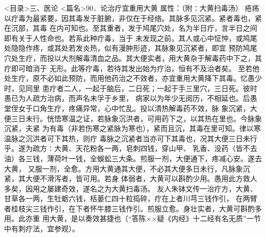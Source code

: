 \documentclass[a4paper,12pt,UTF8,twoside]{ctexbook}
\begin{document}
<目录>三、医论
<篇名>90．论治疔宜重用大黄
属性：（附∶大黄扫毒汤） 
疮疡以疔毒为最紧要，因其毒发于脏腑，非仅在于经络。其脉多见沉紧。紧者毒也，紧在沉部，其毒 
在内可知也。至其重者，发于鸠尾穴处，名为半日疔，言半日之间即有关于人性命也。若系此种疔毒，当于 
未发现之前，其人或心中怔忡，或鸠尾处隐隐作疼，或其处若发炎热，似有漫肿形迹，其脉象见沉紧者，即宜 
预防鸠尾穴处生疔，而投以大剂解毒清血之品。其大便实者，用大黄杂于解毒药中下之，其疔即可暗消于 
无形。此等疔毒，若待其发出始为疗治，恒有不及治者矣。 
至若他处生疔，原不必如此预防，而用他药治之不效者，亦宜重用大黄降下其毒。忆愚少时，见同里 
患疔者二人，一起于脑后，二日死；一起于手三里穴，三日死。彼时愚已为人疏方治病，而声名未孚于乡里， 
病家以为年少无阅历，不相延也。后愚堂侄女于口角生疔，疼痛异常，心中忙乱。投以清热解毒药不效，脉 
象沉紧，大便三日未行。恍悟寒温之证，若脉象沉洪者，可用药下之，以其热在里也。今脉象沉紧，夫紧 
为有毒（非若伤寒之紧脉为寒也），紧而且沉，其毒在里可知。律以寒温脉之沉洪者可下其热，则疔 
毒脉之沉紧者当亦可下其毒也，况其大便三日未行乎。遂为疏方∶大黄、天花粉各一两，皂刺四钱，穿山甲、 
乳香、没药（皆不去油）各三钱，薄荷叶一钱，全蜈蚣三大条。煎服一剂，大便通下，疼减心安。遂去大黄， 
又服一剂，全愈。方用大黄通其大便，不必其大便多日未行，凡脉象沉紧，其大便不滑泻者，皆可用。若身 
体弱者，大黄可以斟酌少用。愚用此方救人多矣，因用之屡建奇效，遂名之为大黄扫毒汤。 
友人朱钵文传一治疔方，大黄、甘草各一两，生牡蛎六钱，栝蒌仁四十粒捣碎，疔在上者川芎三钱作引， 
在两臂者桂枝尖三钱作引，在下者怀牛膝三钱作引。煎服立愈。身壮实者，大黄可斟酌多用。此亦重 
用大黄，是以奏效甚捷也（“答陈××疑《内经》十二经有名无质”一节中有刺疔法，宜参观）。 
\end{document}
